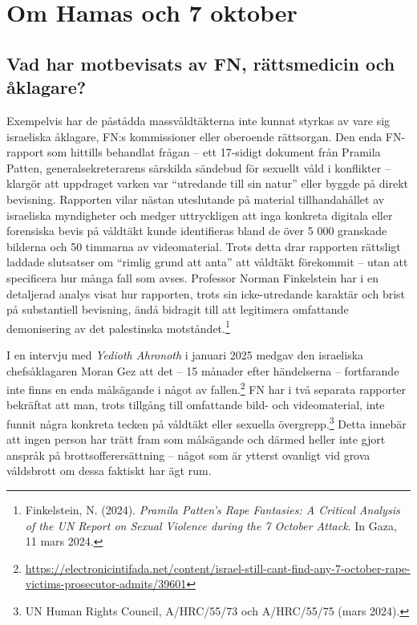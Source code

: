 


\section{Om Hamas och 7 oktober}


\subsection{Vad har motbevisats av FN, rättsmedicin och åklagare?}
Exempelvis har de påstådda massvåldtäkterna inte kunnat styrkas av vare sig israeliska åklagare, FN:s kommissioner eller oberoende rättsorgan. Den enda FN-rapport som hittills behandlat frågan – ett 17-sidigt dokument från Pramila Patten, generalsekreterarens särskilda sändebud för sexuellt våld i konflikter – klargör att uppdraget varken var \enquote{utredande till sin natur} eller byggde på direkt bevisning. Rapporten vilar nästan uteslutande på material tillhandahållet av israeliska myndigheter och medger uttryckligen att inga konkreta digitala eller forensiska bevis på våldtäkt kunde identifieras bland de över 5 000 granskade bilderna och 50 timmarna av videomaterial. Trots detta drar rapporten rättsligt laddade slutsatser om \enquote{rimlig grund att anta} att våldtäkt förekommit – utan att specificera hur många fall som avses. Professor Norman Finkelstein har i en detaljerad analys visat hur rapporten, trots sin icke-utredande karaktär och brist på substantiell bevisning, ändå bidragit till att legitimera omfattande demonisering av det palestinska motståndet.\footnote{Finkelstein, N. (2024). \textit{Pramila Patten’s Rape Fantasies: A Critical Analysis of the UN Report on Sexual Violence during the 7 October Attack}. In Gaza, 11 mars 2024.}

I en intervju med \textit{Yedioth Ahronoth} i januari 2025 medgav den israeliska chefsåklagaren Moran Gez att det – 15 månader efter händelserna – fortfarande inte finns en enda målsägande i något av fallen.\footnote{\url{https://electronicintifada.net/content/israel-still-cant-find-any-7-october-rape-victims-prosecutor-admits/39601}} FN har i två separata rapporter bekräftat att man, trots tillgång till omfattande bild- och videomaterial, inte funnit några konkreta tecken på våldtäkt eller sexuella övergrepp.\footnote{UN Human Rights Council, A/HRC/55/73 och A/HRC/55/75 (mars 2024).}
Detta innebär att ingen person har trätt fram som målsägande och därmed heller inte gjort anspråk på brottsofferersättning – något som är ytterst ovanligt vid grova våldsbrott om dessa faktiskt har ägt rum.

